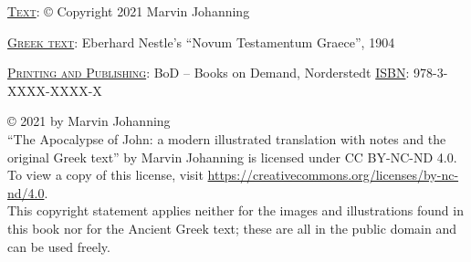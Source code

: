 \thispagestyle{empty}
\vspace*{\fill}
\noindent\textsc{\underline{Text}}: © Copyright 2021 Marvin Johanning

\noindent\textsc{\underline{Greek text}}: Eberhard Nestle's ``Novum Testamentum Graece'', 1904


\noindent\textsc{\underline{Printing and Publishing}}: BoD – Books on Demand, Norderstedt
\noindent\textsc{\underline{ISBN}}: 978-3-XXXX-XXXX-X

\bigskip

\noindent© 2021 by Marvin Johanning \ccbyncnd\\``The Apocalypse of John: a modern illustrated translation with notes and the original Greek text'' by Marvin Johanning is licensed under CC BY-NC-ND 4.0. To view a copy of this license, visit \url{https://creativecommons.org/licenses/by-nc-nd/4.0}.\\This copyright statement applies neither for the images and illustrations found in this book nor for the Ancient Greek text; these are all in the public domain and can be used freely.

\vspace{30mm}
\noindent{}
\newpage